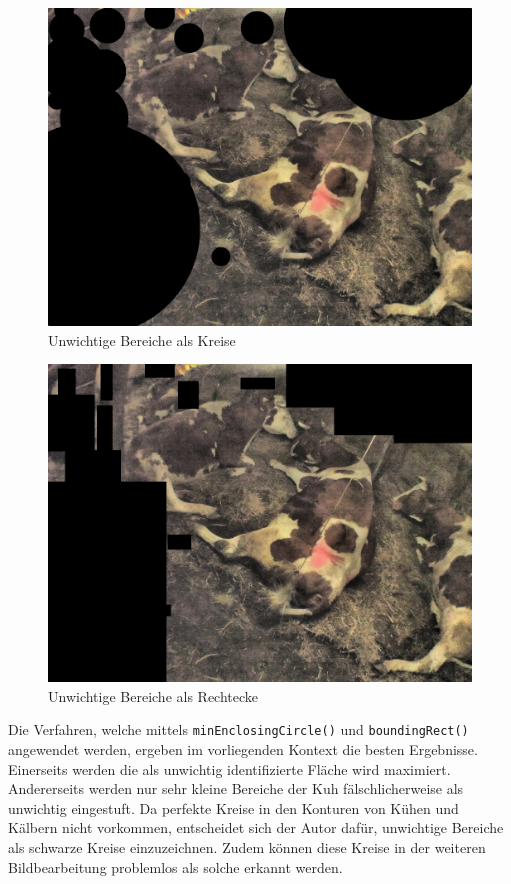 \begin{figure}[H]
	\center
	\includegraphics[scale=0.43]{Grafiken/entwicklung/7unwichtigeKreise.jpg}
	\caption{Unwichtige Bereiche als Kreise } 
	\label{fig: Unwichtige Bereiche als Kreise}
\end{figure}

\begin{figure}[H]
	\center
	\includegraphics[scale=0.43]{Grafiken/entwicklung/7unwichtigeRechtecke.jpg}
	\caption{Unwichtige Bereiche als Rechtecke} 
	\label{fig: Unwichtige Bereiche als Rechtecke}
\end{figure}

Die Verfahren, welche mittels \texttt{minEnclosingCircle()} und \texttt{boundingRect()} angewendet werden, ergeben im vorliegenden Kontext die besten Ergebnisse. Einerseits werden die als unwichtig identifizierte Fläche wird maximiert. Andererseits werden nur sehr kleine Bereiche der Kuh fälschlicherweise als unwichtig eingestuft. Da perfekte Kreise in den Konturen von Kühen und Kälbern nicht vorkommen, entscheidet sich der Autor dafür, unwichtige Bereiche als schwarze Kreise einzuzeichnen. Zudem können diese Kreise in der weiteren Bildbearbeitung problemlos als solche erkannt werden.

